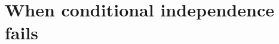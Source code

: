 \documentclass[aspectratio=169,11pt]{beamer}
\begin{document}








\section{When conditional independence fails}
\end{document}
